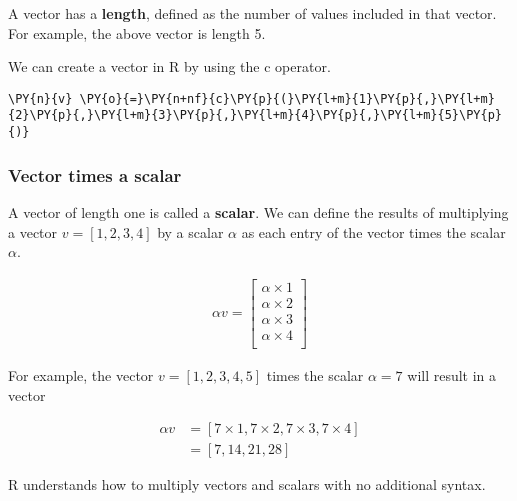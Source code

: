 A vector has a \textbf{length}, defined as the number of values included
in that vector. For example, the above vector is length 5.

We can create a vector in R by using the c operator.

    \begin{tcolorbox}[breakable, size=fbox, boxrule=1pt, pad at break*=1mm,colback=cellbackground, colframe=cellborder]
\begin{Verbatim}[commandchars=\\\{\}]
\PY{n}{v} \PY{o}{=}\PY{n+nf}{c}\PY{p}{(}\PY{l+m}{1}\PY{p}{,}\PY{l+m}{2}\PY{p}{,}\PY{l+m}{3}\PY{p}{,}\PY{l+m}{4}\PY{p}{,}\PY{l+m}{5}\PY{p}{)}
\end{Verbatim}
\end{tcolorbox}

    \hypertarget{vector-times-a-scalar}{%
\subsubsection{Vector times a scalar}\label{vector-times-a-scalar}}

A vector of length one is called a \textbf{scalar}. We can define the
results of multiplying a vector \(v=[1,2,3,4]\) by a scalar \(\alpha\)
as each entry of the vector times the scalar \(\alpha\).

\begin{align}
    \alpha v = \left [
                    \begin{matrix}
                    \alpha \times 1 \\ 
                    \alpha \times 2 \\
                    \alpha \times 3 \\
                    \alpha \times 4 \\
                \end{matrix} \right ]
\end{align}

For example, the vector \(v = [1,2,3,4,5]\) times the scalar
\(\alpha=7\) will result in a vector

\begin{align}
    \alpha v &= [7 \times 1, 7 \times 2, 7 \times 3, 7 \times 4  ]\\
             &= [7, 14, 21, 28]
\end{align}

R understands how to multiply vectors and scalars with no additional
syntax.

